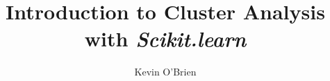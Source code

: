 \documentclass[12pt]{article}
\begin{document}
\author{Kevin O'Brien}
\title{Introduction to Cluster Analysis with \textbf{\textit{Scikit.learn}}}
\large
\tableofcontents
\newpage


%
%
%
\end{document}
